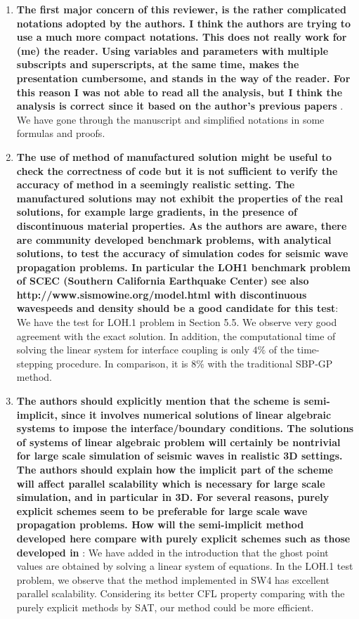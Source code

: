 \documentclass[twoside,11pt]{article}
\begin{document}
\begin{enumerate}
\item \textbf{The first major concern of this reviewer, is the rather complicated notations adopted by the authors. I think the authors are trying to use a much more compact notations. This does not really work for (me) the reader. Using variables and parameters with multiple subscripts and superscripts, at the same time, makes the presentation cumbersome, and stands in the way of the reader. For this reason I was not able to read all the analysis, but I think the analysis is correct since it based on the author’s previous papers} \cite{petersson2009stable,wang2019fourth,petersson2015wave}.\\
 We have gone through the manuscript and simplified notations in some formulas and proofs.

\item  \textbf{The use of method of manufactured solution might be useful to check the correctness of code but it is not sufficient to verify the accuracy of method in a seemingly realistic setting. The manufactured solutions may not exhibit the properties of the real solutions, for example large gradients, in the presence of discontinuous material properties. As the authors are aware, there are community developed benchmark problems, with analytical solutions, to test the accuracy of simulation codes for seismic wave propagation problems. In particular the LOH1 benchmark problem of SCEC (Southern California Earthquake Center) see also http://www.sismowine.org/model.html with discontinuous wavespeeds and density should be a good candidate for this test}: We have the test for LOH.1 problem in Section 5.5. We observe very good agreement with the exact solution. In addition, the computational time of solving the linear system for interface coupling is only $4\%$ of the time-stepping procedure. In comparison, it is $8\%$ with the traditional SBP-GP method.

\item  \textbf{The authors should explicitly mention that the scheme is semi-implicit, since it involves numerical solutions of linear algebraic systems to impose the interface/boundary conditions. The solutions of systems of linear algebraic problem will certainly be nontrivial for large scale simulation of seismic waves in realistic 3D settings. The authors should explain how the implicit part of the scheme will affect parallel scalability which is necessary for large scale simulation, and in particular in 3D. For several reasons, purely explicit schemes seem to be preferable for large scale wave propagation problems. How will the semi-implicit method developed here compare with purely explicit schemes such as those developed in} \cite{virta2014acoustic,duru2014stable}: We have added in the introduction that the ghost point values are obtained by solving a linear system of equations. In the LOH.1 test problem, we observe that the method implemented in SW4 has excellent parallel scalability. Considering its better CFL property comparing with the purely explicit methods by SAT, our method could be more efficient. 


\end{enumerate}
\end{document}
